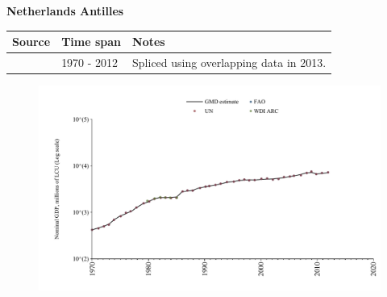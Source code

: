 \documentclass[12pt,a4paper,landscape]{article}
\begin{document}
\begin{adjustbox}{max totalsize={\paperwidth}{\paperheight},center}
\begin{minipage}[t][\textheight][t]{\textwidth}
\begin{figure}[H]
\end{figure}
\end{minipage}
\end{adjustbox}
\begin{adjustbox}{max totalsize={\paperwidth}{\paperheight},center}
\begin{minipage}[t][\textheight][t]{\textwidth}
\vspace*{0.5cm}
{}
\begin{center}
{\Large\bfseries Netherlands Antilles}
\end{center}
\vspace{0.5cm}
\begin{table}[H]
\centering
\small
\begin{tabular}{|l|l|l|}
\hline
\textbf{Source} & \textbf{Time span} & \textbf{Notes} \\
\hline
\rowcolor{white}\cite{UN}& 1970 - 2012 &Spliced using overlapping data in 2013.\\
\hline
\end{tabular}
\end{table}
\begin{figure}[H]
\centering
\includegraphics[width=\textwidth,height=0.6\textheight,keepaspectratio]{graphs/ANT_nGDP.pdf}
\end{figure}
\end{minipage}
\end{adjustbox}
\end{document}
